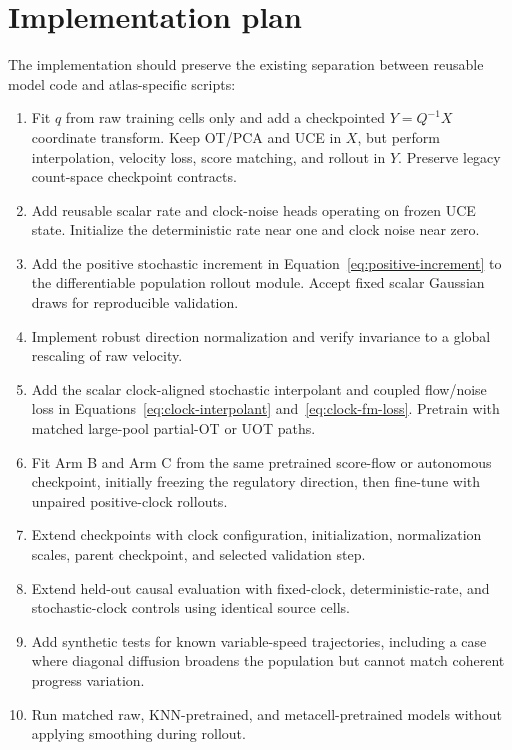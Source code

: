 \documentclass[11pt]{article}
\newcommand{\uce}{UCE}
\begin{document}
\section{Implementation plan}

The implementation should preserve the existing separation between reusable
model code and atlas-specific scripts:
\begin{enumerate}
  \item Fit $q$ from raw training cells only and add a checkpointed
        $Y=Q^{-1}X$ coordinate transform. Keep OT/PCA and \uce{} in $X$, but
        perform interpolation, velocity loss, score matching, and rollout in
        $Y$. Preserve legacy count-space checkpoint contracts.
  \item Add reusable scalar rate and clock-noise heads operating on frozen
        \uce{} state. Initialize the deterministic rate near one and clock
        noise near zero.
  \item Add the positive stochastic increment in
        Equation~\ref{eq:positive-increment} to the differentiable population
        rollout module. Accept fixed scalar Gaussian draws for reproducible
        validation.
  \item Implement robust direction normalization and verify invariance to a
        global rescaling of raw velocity.
  \item Add the scalar clock-aligned stochastic interpolant and coupled
        flow/noise loss in Equations~\ref{eq:clock-interpolant}
        and~\ref{eq:clock-fm-loss}. Pretrain with matched large-pool partial-OT
        or UOT paths.
  \item Fit Arm B and Arm C from the same pretrained score-flow or autonomous
        checkpoint, initially freezing the regulatory direction, then
        fine-tune with unpaired positive-clock rollouts.
  \item Extend checkpoints with clock configuration, initialization,
        normalization scales, parent checkpoint, and selected validation step.
  \item Extend held-out causal evaluation with fixed-clock, deterministic-rate,
        and stochastic-clock controls using identical source cells.
  \item Add synthetic tests for known variable-speed trajectories, including a
        case where diagonal diffusion broadens the population but cannot match
        coherent progress variation.
  \item Run matched raw, KNN-pretrained, and metacell-pretrained models without
        applying smoothing during rollout.
\end{enumerate}
\end{document}
